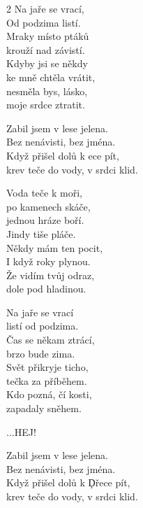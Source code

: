 
\begin{multicols}{2}
\ve{}
Na jaře se vrací,\\
Od podzima listí.\\
Mraky místo ptáků\\
krouží nad závistí.\\
Kdyby jsi se někdy\\
ke mně chtěla vrátit,\\
nesměla bys, lásko,\\
moje srdce ztratit.

\cho{}
Zabil jsem v lese jelena.\\
Bez nenávisti, bez jména.\\
Když přišel dolů k ece pít,\\
krev teče do vody, v srdci klid.

\ve{}
Voda teče k moři,\\
po kamenech skáče,\\
jednou hráze boří.\\
Jindy tiše pláče.\\
Někdy mám ten pocit,\\
I když roky plynou.\\
Že vidím tvůj odraz,\\
dole pod hladinou.

\cho{}

\ve{}
Na jaře se vrací\\
listí od podzima.\\
Čas se někam ztrácí,\\
brzo bude zima.\\
Svět přikryje ticho,\\
tečka za příběhem.\\
Kdo pozná, čí kosti,\\
zapadaly sněhem.\

\cho{}
...HEJ! 

\cho{}
Zabil jsem v lese jelena.\\
Bez nenávisti, bez jména.\\
Když přišel dolů k \c{D}{ř}ece pít,\\
krev teče do vody, v srdci klid.

\end{multicols}

\vspace{-2.5cm}

\esong{}